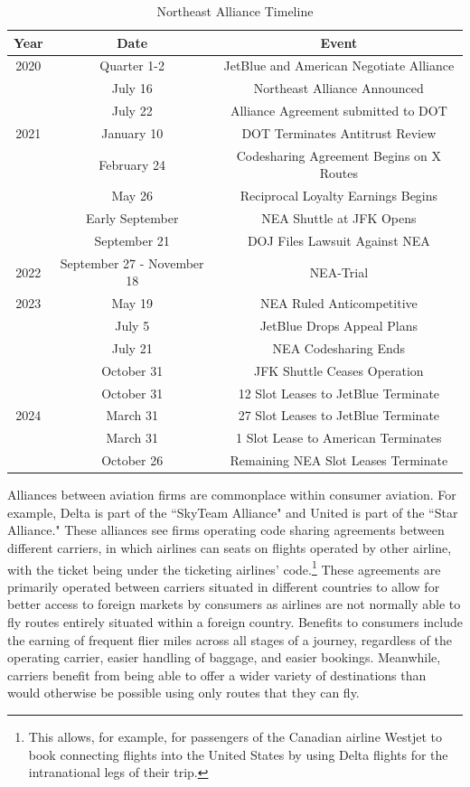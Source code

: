\documentclass{article}
\begin{document}
    			\begin{table}[tb]
		\caption{Northeast Alliance Timeline}
		\label{tab:NEA_Timeline}
		\begin{center}
			\begin{tabular}{ccc}
				\hline
				Year & Date & Event \\
				\hline
				2020 & Quarter 1-2 & JetBlue and American Negotiate Alliance \\ 
				& July 16 & Northeast Alliance Announced \\
				& July 22 & Alliance Agreement submitted to DOT \\
				\hline 
				2021 & January 10 & DOT Terminates Antitrust Review \\
				& February 24 & Codesharing Agreement Begins on {X} Routes \\
				& May 26 & Reciprocal Loyalty Earnings Begins \\
				& Early September & NEA Shuttle at JFK Opens \\
				& September 21 & DOJ Files Lawsuit Against NEA \\  
				\hline
				2022 & September 27 - November 18 & NEA-Trial \\
				\hline 
				2023 & May 19 & NEA Ruled Anticompetitive \\
				& July 5 & JetBlue Drops Appeal Plans \\
				& July 21 & NEA Codesharing Ends \\
				& October 31 & JFK Shuttle Ceases Operation\\
				& October 31 & 12 Slot Leases to JetBlue Terminate \\
				\hline 
				2024 &  March 31  & 27 Slot Leases to JetBlue Terminate \\ 
				& March 31 & 1 Slot Lease to American Terminates \\
				& October 26 & Remaining NEA Slot Leases Terminate				 \end{tabular}
		\end{center}
	\end{table}

	
	Alliances between aviation firms are commonplace within consumer aviation. For example, Delta is part of the ``SkyTeam Alliance" and United is part of the ``Star Alliance." These alliances see firms operating code sharing agreements between different carriers, in which airlines can seats on flights operated by other airline, with the ticket being under the ticketing airlines' code.\footnote{This allows, for example, for passengers of the Canadian airline Westjet to book connecting flights into the United States by using Delta flights for the intranational legs of their trip.}  These agreements are primarily operated between carriers situated in different countries to allow for better access to foreign markets by consumers as airlines are not normally able to fly routes entirely situated within a foreign country. Benefits to consumers include the earning of frequent flier miles across all stages of a journey, regardless of the operating carrier, easier handling of baggage, and easier bookings. Meanwhile, carriers benefit from being able to offer a wider variety of destinations than would otherwise be possible using only routes that they can fly.
	
\end{document}
